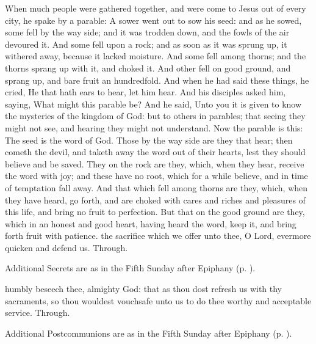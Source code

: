  When much people were gathered together, and were come to Jesus out of every city, he spake by a parable: A sower went out to sow his seed: and as he sowed, some fell by the way side; and it was trodden down, and the fowls of the air devoured it. And some fell upon a rock; and as soon as it was sprung up, it withered away, because it lacked moisture. And some fell among thorns; and the thorns sprang up with it, and choked it. And other fell on good ground, and sprang up, and bare fruit an hundredfold. And when he had said these things, he cried, He that hath ears to hear, let him hear. And his disciples asked him, saying, What might this parable be? And he said, Unto you it is given to know the mysteries of the kingdom of God: but to others in parables; that seeing they might not see, and hearing they might not understand. Now the parable is this: The seed is the word of God. Those by the way side are they that hear; then cometh the devil, and taketh away the word out of their hearts, lest they should believe and be saved. They on the rock are they, which, when they hear, receive the word with joy; and these have no root, which for a while believe, and in time of temptation fall away. And that which fell among thorns are they, which, when they have heard, go forth, and are choked with cares and riches and pleasures of this life, and bring no fruit to perfection. But that on the good ground are they, which in an honest and good heart, having heard the word, keep it, and bring forth fruit with patience.
\vspace{-1ex}
\secret
{} the sacrifice which we offer unto thee, O Lord, evermore quicken and defend us. Through.
\begin{rubric}
    Additional Secrets are as in the Fifth Sunday after Epiphany (p. \pageref{EpiphanyV}).
\end{rubric}
\postcommunion
{} humbly beseech thee, almighty God: that as thou dost refresh us with thy sacraments, so thou wouldest vouchsafe unto us to do thee worthy and acceptable service. Through.
\begin{rubric}
    Additional Postcommunions are as in the Fifth Sunday after Epiphany (p. \pageref{EpiphanyV}).
\end{rubric}

